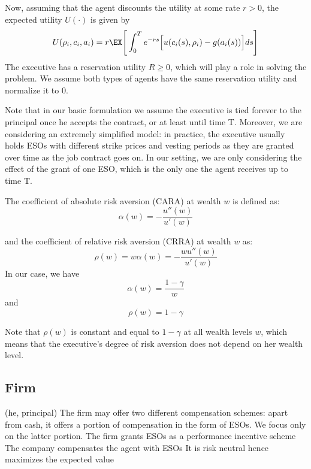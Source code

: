 Now, assuming that the agent discounts the utility at some rate $r>0$, the expected utility $U(\cdot)$ is given by
$$U(\rho_i, c_i, a_i) = r \EX \Bigg[ \int_{0}^{T} e^{-rs} \Big[u(c_i(s), \rho_i) - g(a_i(s)) \Big] ds \Bigg] $$
The executive has a reservation utility $R \ge 0$, which will play a role in solving the problem. We assume both types of agents have the same reservation utility and normalize it to 0. %


Note that in our basic formulation we assume the executive is tied forever to the principal once he accepts the contract, or at least until time T. Moreover, we are considering an extremely simplified model: in practice, the executive usually holds ESOs with different strike prices and vesting periods as they are granted over time as the job contract goes on. In our setting, we are only considering the effect of the grant of one ESO, which is the only one the agent receives up to time T. 


The coefficient of absolute risk aversion (CARA) at wealth $w$ is defined as:
$$\alpha(w) = -\frac{u''(w)}{u'(w)}$$

and the coefficient of relative risk aversion (CRRA) at wealth $w$ as:
$$ \rho(w) = w \alpha(w) = -\frac{wu''(w)}{u'(w)} $$
In our case, we have 
$$ \alpha(w) = \frac{1-\gamma}{w}$$
and
$$ \rho(w) = 1-\gamma$$

Note that $\rho(w)$ is constant and equal to $1-\gamma$ at all wealth levels $w$, which means that the executive's degree of risk aversion does not depend on her wealth level. 




\subsection{Firm}
(he, principal)
The firm may offer two different compensation schemes: apart from cash, it offers a portion of compensation in the form of ESOs. We focus only on the latter portion. The firm grants ESOs as a performance incentive scheme
The company compensates the agent with ESOs
It is risk neutral hence maximizes the expected value


